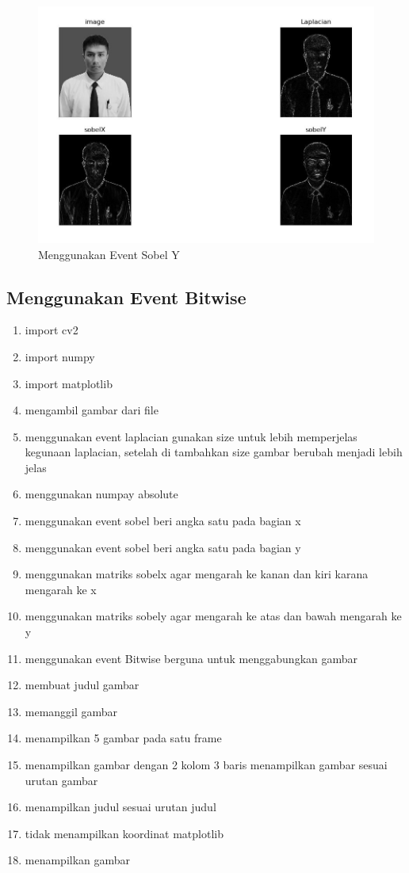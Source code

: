 \begin{figure}[ht]
\centering
\includegraphics[scale=0.5]{figures/2,67.jpg}
\caption{Menggunakan Event Sobel Y}
\label{contoh}
\end{figure}







\newpage
\subsection{Menggunakan Event Bitwise}

\begin{enumerate}
	\item import cv2
	\item import numpy
	\item import matplotlib
	\item mengambil gambar dari file
	\item menggunakan event laplacian gunakan size untuk lebih memperjelas kegunaan laplacian, setelah di tambahkan size gambar berubah menjadi lebih jelas
	\item menggunakan numpay absolute
	\item menggunakan event sobel beri angka satu pada bagian x
	\item menggunakan event sobel beri angka satu pada bagian y
	\item menggunakan matriks sobelx agar mengarah ke kanan dan kiri karana mengarah ke x
	\item menggunakan matriks sobely agar mengarah ke atas dan bawah mengarah ke y
	\item menggunakan event Bitwise berguna untuk menggabungkan gambar
	\item membuat judul gambar
	\item memanggil gambar
	\item menampilkan 5 gambar pada satu frame
	\item menampilkan gambar dengan 2 kolom 3 baris menampilkan gambar sesuai urutan gambar
	\item menampilkan judul sesuai urutan judul
	\item tidak menampilkan koordinat matplotlib
	\item menampilkan gambar
\end{enumerate}

